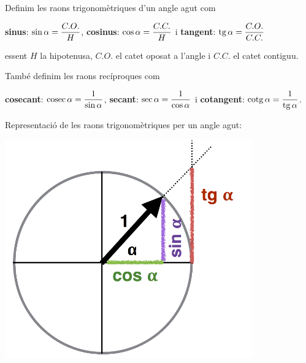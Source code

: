 \begin{theorybox}
	
	Definim les raons trigonomètriques d'un angle agut com
	
	\begin{center}
		\textbf{sinus}: $\sin \alpha = \dfrac{C.O.}{H}$, \textbf{cosinus}: $\cos \alpha = \dfrac{C.C.}{H}$ i \textbf{tangent}: $\mathrm{tg}\, \alpha = \dfrac{C.O.}{C.C.}$
	\end{center}
	
	essent $H$ la hipotenusa, $C.O.$ el catet oposat a l'angle i $C.C.$ el catet contiguu. 
	
	També definim les raons recíproques com 
	
	\begin{center}
		\textbf{cosecant}:	$\mathrm{cosec}\, \alpha = \dfrac{1}{\sin \alpha}$, \textbf{secant}: $\sec \alpha = \dfrac{1}{\cos \alpha}$ i \textbf{cotangent}: $\mathrm{cotg}\, \alpha = \dfrac{1}{\mathrm{tg}\, \alpha}$.
	\end{center}
	
	
	\begin{minipage}{0.65\textwidth}
		\vspace{-0.75cm}	
		
		\vspace{0.4cm}
		Representació de les raons trigonomètriques per un angle agut:	
	\end{minipage}
	\begin{minipage}{0.35\textwidth}
		
		\begin{center}
			\includegraphics*[width=0.8\textwidth]{img-03/chap-trig-grafraons.png}
		\end{center}
	\end{minipage}
\end{theorybox}

